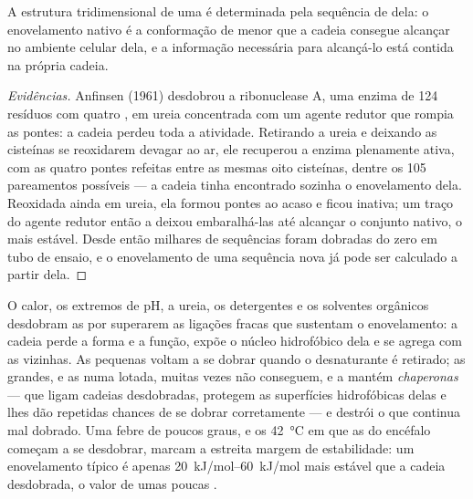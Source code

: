\begin{theorem}\label{thm:b1:proteins:anfinsen}
A estrutura tridimensional de uma  é determinada pela sequência
de  dela: o enovelamento nativo é a conformação de menor
 que a cadeia consegue alcançar no ambiente celular dela, e
a informação necessária para alcançá-lo está contida na própria cadeia.
\end{theorem}
\begin{proof}[Evidências]
Anfinsen (1961) desdobrou a ribonuclease A, uma enzima de \qty{124}{}
resíduos com quatro , em ureia concentrada com um
agente redutor que rompia as pontes: a cadeia perdeu toda a atividade.
Retirando a ureia e deixando as cisteínas se reoxidarem devagar ao ar,
ele recuperou a enzima plenamente ativa, com as quatro pontes refeitas
entre as mesmas oito cisteínas, dentre os \qty{105}{} pareamentos
possíveis --- a cadeia tinha encontrado sozinha o enovelamento dela.
Reoxidada ainda em ureia, ela formou pontes ao acaso e ficou inativa;
um traço do agente redutor então a deixou embaralhá-las até alcançar o
conjunto nativo, o mais estável. Desde então milhares de sequências
foram dobradas do zero em tubo de ensaio, e o enovelamento de uma
sequência nova já pode ser calculado a partir dela.
\end{proof}

\begin{proposition}[Desnaturação]\label{prop:b1:proteins:denaturation}
O calor, os extremos de pH, a ureia, os detergentes e os solventes
orgânicos desdobram as  por superarem as ligações fracas que
sustentam o enovelamento: a cadeia perde a forma e a função, expõe o
núcleo hidrofóbico dela e se agrega com as vizinhas. As 
pequenas voltam a se dobrar quando o desnaturante é retirado; as
grandes, e as  numa  lotada, muitas vezes não conseguem,
e a  mantém \emph{chaperonas} ---  que
ligam cadeias desdobradas, protegem as superfícies hidrofóbicas delas e
lhes dão repetidas chances de se dobrar corretamente --- e destrói o
que continua mal dobrado. Uma febre de poucos graus, e os
\qty{42}{\celsius} em que as  do encéfalo começam a se
desdobrar, marcam a estreita margem de estabilidade: um enovelamento
típico é apenas \qtyrange{20}{60}{kJ/mol} mais estável que a cadeia
desdobrada, o valor de umas poucas .
\end{proposition}

